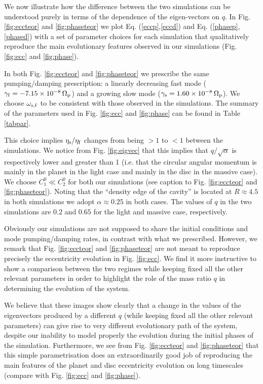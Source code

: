 \documentclass[usenatbib,a4paper,times,fleqn]{mnras}
\begin{document}
We now illustrate how the difference between the two simulations can be understood purely in terms of the dependence of the eigen-vectors on $q$. In Fig. \ref{fig:eccteor} and \ref{fig:phaseteor} we plot Eq. (\ref{eccp},\ref{eccd}) and Eq. (\ref{phasep},\ref{phased}) with a set of parameter choices for each simulation that qualitatively reproduce the main evolutionary features observed in our simulations (Fig. \ref{fig:ecc} and \ref{fig:phase}).

In both Fig. \ref{fig:eccteor} and \ref{fig:phaseteor} we prescribe the same pumping/damping prescription: a linearly decreasing fast mode ($\gamma_{\rm f}=-7.15\times 10^{-8}\,\Omega_{\rm p}$) and a growing slow mode ($\gamma_{\rm s}= 1.60\times 10^{-8}\,\Omega_{\rm p}$). We choose $\omega_{\rm s,f}$ to be consistent with those observed in the simulations. The summary of the parameters used in Fig. \ref{fig:ecc} and \ref{fig:phase} can be found in Table \ref{tabpar}.

This choice implies $\eta_{\rm s}/\eta_{\rm f}$ changes from being $> 1$ to $< 1$ between the simulations. We notice from Fig. \ref{fig:eigvec} that this implies that $q/\sqrt{\alpha}$ is respectively lower and greater than 1 (i.e. that the circular angular momentum is mainly in the planet in the light case and mainly in the disc in the massive case). We choose $C_1^0\ll C_2^0$ for both our simulations (see caption to Fig. \ref{fig:eccteor} and \ref{fig:phaseteor}). Noting that the ``density edge of the cavity'' is located at $R \approx 4.5$ in both simulations we adopt $\alpha \approx 0.25$ in both cases. The values of $q$ in the two simulations are $0.2$ and $0.65$ for the light and massive case, respectively.

Obviously our simulations are not supposed to share the initial conditions and mode pumping/damping rates, in contrast with what we prescribed.
However, we remark that Fig. \ref{fig:eccteor} and \ref{fig:phaseteor} are not meant to reproduce precisely the eccentricity evolution in Fig. \ref{fig:ecc}. We find it more instructive to show a comparison between the two regimes while keeping fixed all the other relevant parameters in order to highlight the role of the mass ratio $q$ in determining the evolution of the system.

We believe that these images show clearly that a change in the values of the eigenvectors produced by a different $q$ (while keeping fixed all the other relevant parameters) can give rise to very different evolutionary path of the system, despite our inability to model properly the evolution during the initial phases of the simulation. Furthermore, we see from Fig. \ref{fig:eccteor} and \ref{fig:phaseteor} that this simple parametrisation does an extraordinarily good job of reproducing the main features of the planet and disc eccentricity evolution on long timescales (compare with Fig. \ref{fig:ecc} and \ref{fig:phase}). 
\end{document}
